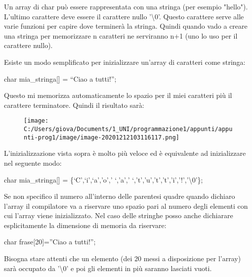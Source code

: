 \documentclass[
]{article}
\newenvironment{Shaded}{}{}
\newcommand{\DataTypeTok}[1]{\textcolor[rgb]{0.56,0.13,0.00}{#1}}
\newcommand{\DecValTok}[1]{\textcolor[rgb]{0.25,0.63,0.44}{#1}}
\newcommand{\NormalTok}[1]{#1}
\begin{document}
Un array di char può essere rappresentata con una stringa (per esempio
"hello"). L'ultimo carattere deve essere il carattere nullo
'\textbackslash0'. Questo carattere serve alle varie funzioni per capire
dove terminerà la stringa. Quindi quando vado a creare una stringa per
memorizzare n caratteri ne serviranno n+1 (uno lo uso per il carattere
nullo).

Esiste un modo semplificato per inizializzare un'array di caratteri come
stringa:

\begin{Shaded}
\begin{Highlighting}[]
\DataTypeTok{char}\NormalTok{ mia\_stringa[] = “Ciao a tutti!”;}
\end{Highlighting}
\end{Shaded}

Questo mi memorizza automaticamente lo spazio per il miei caratteri più
il carattere terminatore. Quindi il risultato sarà:

\begin{figure}
\centering
\texttt{[image: C:/Users/giova/Documents/1\_UNI/programmazione1/appunti/appunti-prog1/image/image-20201212103116117.png]}
\caption{}
\end{figure}

L'inizializzazione vista sopra è molto più veloce ed è equivalente ad
inizializzare nel seguente modo:

\begin{Shaded}
\begin{Highlighting}[]
\DataTypeTok{char}\NormalTok{ mia\_stringa[] = \{‘C’,‘i’,‘a’,’o’,’ ‘,’a’,’ ‘,’t’,’u’,’t’,’t’,’i’,’!’,’\textbackslash{}}\DecValTok{0}\NormalTok{’\};}
\end{Highlighting}
\end{Shaded}

Se non specifico il numero all'interno delle parentesi quadre quando
dichiaro l'array il compilatore va a riservare uno spazio pari al numero
degli elementi con cui l'array viene inizializzato. Nel caso delle
stringhe posso anche dichiarare esplicitamente la dimensione di memoria
da riservare:

\begin{Shaded}
\begin{Highlighting}[]
\DataTypeTok{char}\NormalTok{ frase[}\DecValTok{20}\NormalTok{]=”Ciao a tutti!”;}
\end{Highlighting}
\end{Shaded}

Bisogna stare attenti che un elemento (dei 20 messi a disposizione per
l'array) sarà occupato da '\textbackslash0' e poi gli elementi in più
saranno lasciati vuoti.
\end{document}
